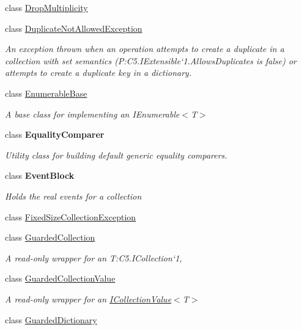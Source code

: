 \begin{DoxyCompactItemize}
\item 
class \hyperlink{class_c5_1_1_drop_multiplicity}{Drop\+Multiplicity}
\item 
class \hyperlink{class_c5_1_1_duplicate_not_allowed_exception}{Duplicate\+Not\+Allowed\+Exception}
\begin{DoxyCompactList}\small\item\em An exception thrown when an operation attempts to create a duplicate in a collection with set semantics (P\+:\+C5.\+I\+Extensible`1.\+Allows\+Duplicates is false) or attempts to create a duplicate key in a dictionary. \end{DoxyCompactList}\item 
class \hyperlink{class_c5_1_1_enumerable_base}{Enumerable\+Base}
\begin{DoxyCompactList}\small\item\em A base class for implementing an I\+Enumerable$<$T$>$ \end{DoxyCompactList}\item 
class {\bfseries Equality\+Comparer}
\begin{DoxyCompactList}\small\item\em Utility class for building default generic equality comparers. \end{DoxyCompactList}\item 
class {\bfseries Event\+Block}
\begin{DoxyCompactList}\small\item\em Holds the real events for a collection \end{DoxyCompactList}\item 
class \hyperlink{class_c5_1_1_fixed_size_collection_exception}{Fixed\+Size\+Collection\+Exception}
\item 
class \hyperlink{class_c5_1_1_guarded_collection}{Guarded\+Collection}
\begin{DoxyCompactList}\small\item\em A read-\/only wrapper for an T\+:\+C5.\+I\+Collection`1, \end{DoxyCompactList}\item 
class \hyperlink{class_c5_1_1_guarded_collection_value}{Guarded\+Collection\+Value}
\begin{DoxyCompactList}\small\item\em A read-\/only wrapper for an \hyperlink{interface_c5_1_1_i_collection_value}{I\+Collection\+Value}$<$T$>$ \end{DoxyCompactList}\item 
class \hyperlink{class_c5_1_1_guarded_dictionary}{Guarded\+Dictionary}

\end{DoxyCompactItemize}
